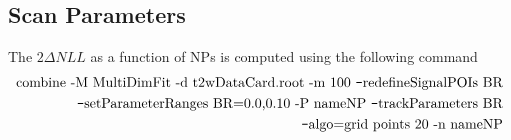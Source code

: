 \subsection*{Scan Parameters}
The $2\Delta NLL$ as a function of NPs is computed using the following command
\begin{align}
\text{combine -M MultiDimFit -d t2wDataCard.root -m 100 \texttt{--}redefineSignalPOIs BR} \nonumber \\
\text{\texttt{--}setParameterRanges BR=0.0,0.10 -P nameNP \texttt{--}trackParameters BR} \nonumber \\ 
\text{\texttt{--}algo=grid points 20 -n nameNP}
\label{cmd:deltaNLL}
\end{align}
